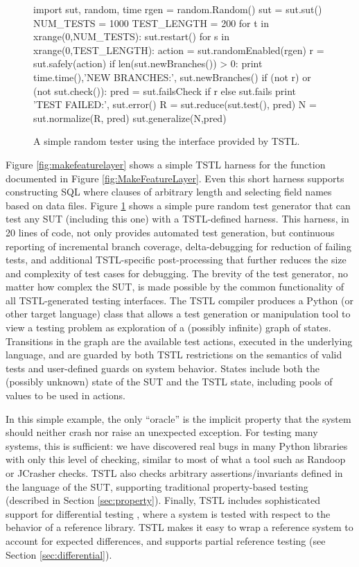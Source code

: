 \begin{figure}
{\scriptsize
\begin{code}
import sut, random, time
rgen = random.Random()
sut = sut.sut()
NUM\_TESTS = 1000
TEST\_LENGTH = 200 
for t in xrange(0,NUM\_TESTS):
   sut.restart()
   for s in xrange(0,TEST\_LENGTH): 
       action = sut.randomEnabled(rgen)
       r = sut.safely(action)
       if len(sut.newBranches()) > 0:
          print time.time(),'NEW BRANCHES:', sut.newBranches()
       if (not r) or (not sut.check()):
          pred = sut.failsCheck if r else sut.fails
          print 'TEST FAILED:', sut.error() 
          R = sut.reduce(sut.test(), pred)
          N = sut.normalize(R, pred) 
          sut.generalize(N,pred)
\end{code}
}
\caption{A simple random tester using the interface provided by TSTL.}
\label{fig:rt}
\end{figure}

Figure \ref{fig:makefeaturelayer} shows a simple TSTL harness for the
function documented in Figure \ref{fig:MakeFeatureLayer}.  Even this
short harness supports constructing SQL where clauses of arbitrary
length and selecting field names based on data files.  Figure
\ref{fig:rt} shows a simple pure random test generator that can test
any SUT (including this one) with a TSTL-defined harness.  This
harness, in 20 lines of code, not only provides automated test
generation, but continuous reporting of incremental branch coverage,
delta-debugging \cite{DD} for reduction of failing tests, and
additional TSTL-specific post-processing that further reduces the size
and complexity of test cases for debugging.  The brevity of the test
generator, no matter how complex the SUT, is made possible by the
common functionality of all TSTL-generated testing interfaces.  The
TSTL compiler produces a Python (or other target language) class that allows a test generation or manipulation
tool to view a testing problem as exploration of a (possibly infinite)
graph of states.  Transitions in the graph are the available test actions, executed in the underlying language, and are guarded by both TSTL
restrictions on the semantics of valid tests and user-defined guards
on system behavior.  States include both the (possibly unknown) state
of the SUT and the TSTL state, including pools of values to be used in actions.

In this simple example, the only ``oracle'' is the implicit property
that the system should neither crash nor raise an unexpected
exception.  For testing many systems, this is sufficient: we have
discovered real bugs in many Python libraries with only this level of
checking, similar to most of what a tool such as Randoop
\cite{Pacheco} or JCrasher \cite{CsallnerS04} checks.  TSTL also
checks arbitrary assertions/invariants defined in the language of the
SUT, supporting traditional property-based testing
\cite{ClaessenH00,hypothesis} (described in Section \ref{sec:property}).  Finally, TSTL includes sophisticated
support for differential testing \cite{Differential,ICSEDiff}, where a
system is tested with respect to the behavior of a reference library.
TSTL makes it easy to wrap a reference system to account for expected
differences, and supports partial reference testing (see Section \ref{sec:differential}).

